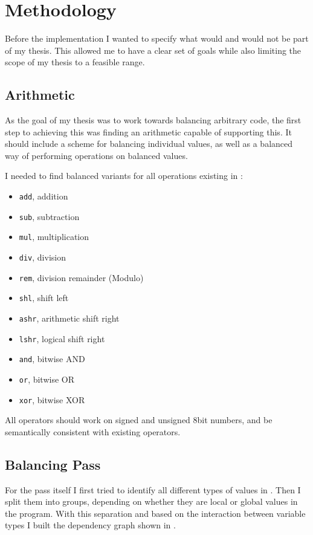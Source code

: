 \section{Methodology}
\label{methodology}
Before the implementation I wanted to specify what would and would not be part of my thesis.
This allowed me to have a clear set of goals while also limiting the scope of my thesis to a feasible range.

\subsection{Arithmetic}
As the goal of my thesis was to work towards balancing arbitrary code, the first step to achieving this was finding an arithmetic capable of supporting this.
It should include a scheme for balancing individual values, as well as a balanced way of performing operations on balanced values.

I needed to find balanced variants for all operations existing in \ir{}:
\begin{itemize}
\item \texttt{add}, addition
\item \texttt{sub}, subtraction
\item \texttt{mul}, multiplication
\item \texttt{div}, division
\item \texttt{rem}, division remainder (Modulo)
\item \texttt{shl}, shift left
\item \texttt{ashr}, arithmetic shift right
\item \texttt{lshr}, logical shift right
\item \texttt{and}, bitwise AND
\item \texttt{or}, bitwise OR
\item \texttt{xor}, bitwise XOR
\end{itemize}

All operators should work on signed and unsigned 8bit numbers, and be semantically consistent with existing \llvm{} operators.

\subsection{Balancing Pass}
For the pass itself I first tried to identify all different types of values in \ir{}.
Then I split them into groups, depending on whether they are local or global values in the program.
With this separation and based on the interaction between variable types I built the dependency graph shown in .


